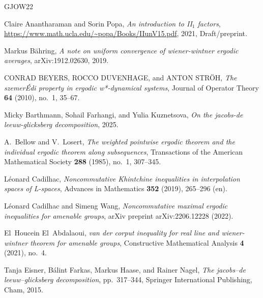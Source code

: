 \documentclass[11pt]{amsart}
\theoremstyle{definition}
\theoremstyle{myremark}
\numberwithin{equation}{section}
\begin{document}
\begin{thebibliography}{GJOW22}
\providecommand{\bysame}{\leavevmode\hbox to3em{\hrulefill}\thinspace}
\providecommand{\MR}{\relax\ifhmode\unskip\space\fi MR }
\providecommand{\MRhref}[2]{%
  \href{http://www.ams.org/mathscinet-getitem?mr=#1}{#2}
}
\providecommand{\href}[2]{#2}

Claire Anantharaman and Sorin Popa, \emph{An introduction to {II$_1$} factors}, \url{https://www.math.ucla.edu/~popa/Books/IIunV15.pdf}, 2021, Draft/preprint.

Markus B{\"a}hring, \emph{A note on uniform convergence of wiener-wintner ergodic averages}, arXiv:1912.02630, 2019.

CONRAD BEYERS, ROCCO DUVENHAGE, and ANTON STRÖH, \emph{The szemerÉdi property in ergodic w*-dynamical systems}, Journal of Operator Theory \textbf{64} (2010), no.~1, 35--67.

Micky Barthmann, Sohail Farhangi, and Yulia Kuznetsova, \emph{On the jacobs-de leeuw-glicksberg decomposition}, 2025.

A.~Bellow and V.~Losert, \emph{The weighted pointwise ergodic theorem and the individual ergodic theorem along subsequences}, Transactions of the American Mathematical Society \textbf{288} (1985), no.~1, 307--345.

L{\'e}onard Cadilhac, \emph{Noncommutative {Khintchine} inequalities in interpolation spaces of {L}-spaces}, Advances in Mathematics \textbf{352} (2019), 265--296 (en).

L{\'e}onard Cadilhac and Simeng Wang, \emph{Noncommutative maximal ergodic inequalities for amenable groups}, arXiv preprint arXiv:2206.12228 (2022).

El~Houcein El~Abdalaoui, \emph{van der corput inequality for real line and wiener-wintner theorem for amenable groups}, Constructive Mathematical Analysis \textbf{4} (2021), no.~4.

Tanja Eisner, B{\'a}lint Farkas, Markus Haase, and Rainer Nagel, \emph{The jacobs--de leeuw--glicksberg decomposition}, pp.~317--344, Springer International Publishing, Cham, 2015.


\end{thebibliography}
\end{document}

